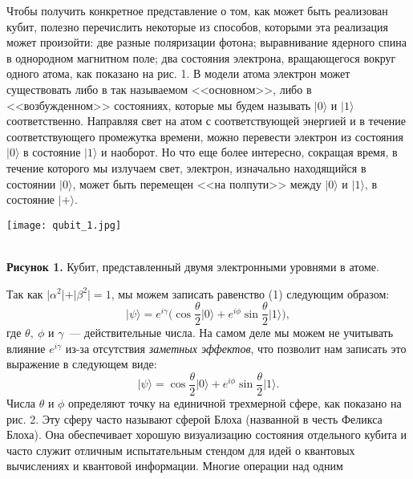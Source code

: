 \begin{multicols}{2}
{    Чтобы получить конкретное представление о том, как
    может быть реализован кубит, полезно перечислить некоторые из способов, которыми эта реализация может произойти: две разные поляризации фотона; выравнивание ядерного спина в
    однородном магнитном поле; два состояния электрона, вращающегося вокруг одного атома, как показано на рис. 1. В модели атома электрон может существовать либо в так называемом <<основном>>, либо в <<возбужденном>> состояниях, которые мы будем называть $\vert0\rangle$ и $\vert1\rangle$ соответственно. Направляя свет на атом
    с соответствующей энергией и в течение соответствующего промежутка времени, можно перевести
    электрон из состояния $\vert0\rangle$ в состояние $\vert1\rangle$ и наоборот. Но что еще более интересно, сокращая время, в течение которого мы излучаем свет, электрон, изначально находящийся в состоянии $\vert0\rangle$, может быть перемещен
    <<на полпути>> между $\vert0\rangle$ и $\vert1\rangle$, в состояние $\vert+\rangle$.
    }
    \begin{center}
    \begin{minipage}{0.3\textwidth}{\texttt{[image: qubit\_1.jpg]}}
    \end{minipage}\\
    \vspace{0.3cm}
    \footnotesize{\textbf{Рисунок 1.} Кубит, представленный двумя электронными уровнями в атоме.}
    \end{center}
    \normalsize{
    Так как \(\vert\alpha^2\vert + \vert\beta^2\vert = 1\), мы можем записать равенство (1) следующим образом:
    }
    \begin{equation}
        \vert\psi\rangle=e^{i\gamma}\Bigg(\cos\frac{\theta}{2}\vert0\rangle+e^{i\phi}\sin\frac{\theta}{2}\vert1\rangle\Bigg),
    \end{equation}
    \normalsize{
    где $\theta,~\phi$ и $\gamma$~--- действительные числа. На самом деле мы можем не учитывать влияние $e^{i\gamma}$ из-за отсутствия \emph{заметных эффектов}, что позволит нам записать это выражение в следующем виде:
    }
    \begin{equation}
        \vert\psi\rangle=\cos\frac{\theta}{2}\vert0\rangle+e^{i\phi}\sin\frac{\theta}{2}\vert1\rangle.
    \end{equation}
    \normalsize{
    Числа $\theta$ и $\phi$ определяют точку на единичной трехмерной сфере, как показано на рис. 2. Эту сферу часто называют сферой Блоха (названной в честь Феликса Блоха).
    Она обеспечивает хорошую визуализацию состояния отдельного кубита и часто служит отличным испытательным стендом для идей о квантовых вычислениях и квантовой информации. Многие операции над одним
}
\end{multicols}
